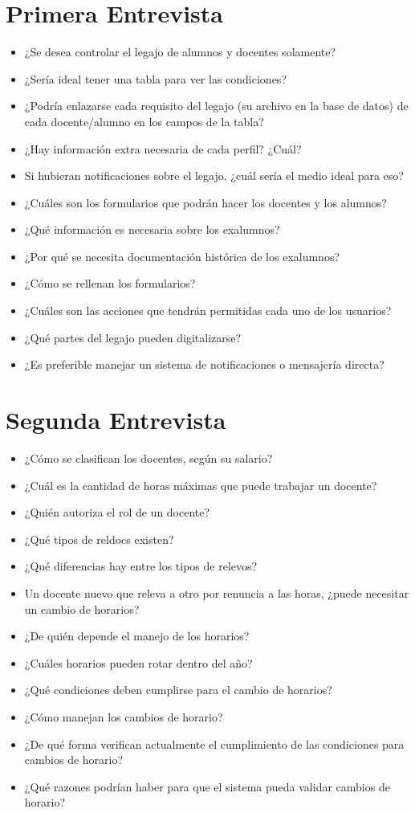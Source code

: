 \section{Primera Entrevista}
\begin{itemize}
  \item ¿Se desea controlar el legajo de alumnos y docentes
  solamente?
  \item ¿Sería ideal tener una tabla para ver las condiciones?
  \item ¿Podría enlazarse cada requisito del legajo (su archivo
  en la base de datos) de cada docente/alumno en los campos de
  la tabla?
  \item ¿Hay información extra necesaria de cada perfil? ¿Cuál?
  \item Si hubieran notificaciones sobre el legajo, ¿cuál sería
  el medio ideal para eso?
  \item ¿Cuáles son los formularios que podrán hacer los docentes
  y los alumnos?
  \item ¿Qué información es necesaria sobre los exalumnos?
  \item ¿Por qué se necesita documentación histórica de los
  exalumnos?
  \item ¿Cómo se rellenan los formularios?
  \item ¿Cuáles son las acciones que tendrán permitidas cada uno
  de los usuarios?
  \item ¿Qué partes del legajo pueden digitalizarse?
  \item ¿Es preferible manejar un sistema de notificaciones o
  mensajería directa?
\end{itemize}
\section{Segunda Entrevista}
\begin{itemize}
  \item ¿Cómo se clasifican los docentes, según su salario?
  \item ¿Cuál es la cantidad de horas máximas que puede trabajar
  un docente?
  \item ¿Quién autoriza el rol de un docente?
  \item ¿Qué tipos de \glspl{reldoc} existen?
  \item ¿Qué diferencias hay entre los tipos de relevos?
  \item Un docente nuevo que releva a otro por renuncia a las
  horas, ¿puede necesitar un cambio de horarios?
  \item ¿De quién depende el manejo de los horarios?
  \item ¿Cuáles horarios pueden rotar dentro del año?
  \item ¿Qué condiciones deben cumplirse para el cambio de
  horarios?
  \item ¿Cómo manejan los cambios de horario?
  \item ¿De qué forma verifican actualmente el cumplimiento de
  las condiciones para cambios de horario?
  \item ¿Qué razones podrían haber para que el sistema pueda
  validar cambios de horario?
\end{itemize}
